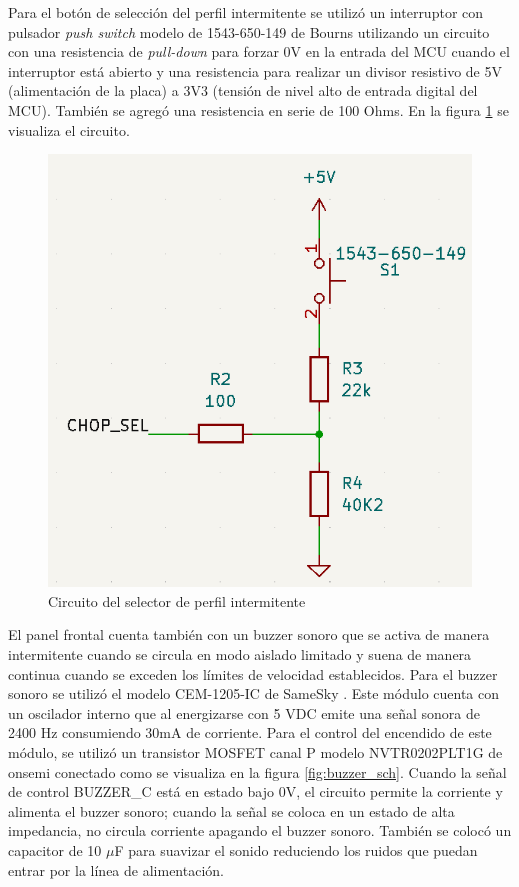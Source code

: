 Para el botón de selección del perfil intermitente se utilizó un interruptor con pulsador \textit{push switch} modelo de 1543-650-149 de Bourns \cite{1543-650-149} utilizando un circuito con una resistencia de \textit{pull-down} para forzar 0V en la entrada del MCU cuando el interruptor está abierto y una resistencia para realizar un divisor resistivo de 5V (alimentación de la placa) a 3V3 (tensión de nivel alto de entrada digital del MCU). También se agregó una resistencia en serie de 100 Ohms. En la figura \ref{fig:chop_sel} se visualiza el circuito. 

\begin{figure}[H]
    \centering
    \includegraphics[width = 0.5 \linewidth]{img/chop_sel.png}
    \caption{Circuito del selector de perfil intermitente}
    \label{fig:chop_sel}
\end{figure}    


El panel frontal cuenta también con un buzzer sonoro que se activa de manera intermitente cuando se circula en modo aislado limitado y suena de manera continua cuando se exceden los límites de velocidad establecidos. Para el buzzer sonoro se utilizó el modelo CEM-1205-IC de SameSky \cite{CEM-1205-IC}. Este módulo cuenta con un oscilador interno que al energizarse con 5 VDC emite una señal sonora de 2400 Hz consumiendo 30mA de corriente. Para el control del encendido de este módulo, se utilizó un transistor MOSFET canal P modelo NVTR0202PLT1G de onsemi \cite{NVTR0202PLT1G} conectado como se visualiza en la figura \ref{fig:buzzer_sch}. Cuando la señal de control BUZZER\_C está en estado bajo 0V, el circuito permite la corriente y alimenta el buzzer sonoro; cuando la señal se coloca en un estado de alta impedancia, no circula corriente apagando el buzzer sonoro. También se colocó un capacitor de 10 $\mu$F para suavizar el sonido reduciendo los ruidos que puedan entrar por la línea de alimentación. 



